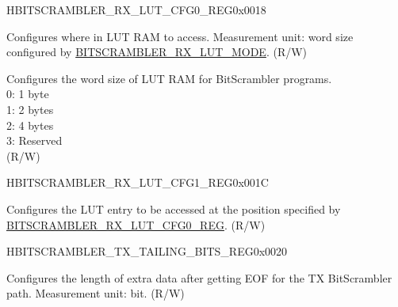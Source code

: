 \begin{register}{H}{BITSCRAMBLER\_RX\_LUT\_CFG0\_REG}{0x0018}\label{regdesc:BITSCRAMBLERRXLUTCFG0REG}
%
%
%
\regnewline%
\begin{regdesc}\begin{reglist}
\label{fielddesc:BITSCRAMBLERRXLUTIDX}\item [BITSCRAMBLER\_RX\_LUT\_IDX] Configures where in LUT RAM to access. Measurement unit: word size configured by \hyperref[fielddesc:BITSCRAMBLERRXLUTMODE]{BITSCRAMBLER\_RX\_LUT\_MODE}. (R/W)
\label{fielddesc:BITSCRAMBLERRXLUTMODE}\item [BITSCRAMBLER\_RX\_LUT\_MODE] Configures the word size of LUT RAM for BitScrambler programs. \\
0: 1 byte\\
1: 2 bytes\\
2: 4 bytes\\
3: Reserved\\
(R/W)
\end{reglist}\end{regdesc}
\end{register}


\begin{register}{H}{BITSCRAMBLER\_RX\_LUT\_CFG1\_REG}{0x001C}\label{regdesc:BITSCRAMBLERRXLUTCFG1REG}
%
\regnewline%
\begin{regdesc}\begin{reglist}
\label{fielddesc:BITSCRAMBLERRXLUT}\item [BITSCRAMBLER\_RX\_LUT] Configures the LUT entry to be accessed at the position specified by  \hyperref[regdesc:BITSCRAMBLERRXLUTCFG0REG]{BITSCRAMBLER\_RX\_LUT\_CFG0\_REG}. (R/W)
\end{reglist}\end{regdesc}
\end{register}


\begin{register}{H}{BITSCRAMBLER\_TX\_TAILING\_BITS\_REG}{0x0020}\label{regdesc:BITSCRAMBLERTXTAILINGBITSREG}
%
%
\regnewline%
\begin{regdesc}\begin{reglist}
\label{fielddesc:BITSCRAMBLERTXTAILINGBITS}\item [BITSCRAMBLER\_TX\_TAILING\_BITS] Configures the length of extra data after getting EOF for the TX BitScrambler path. Measurement unit: bit. (R/W)
\end{reglist}\end{regdesc}
\end{register}


